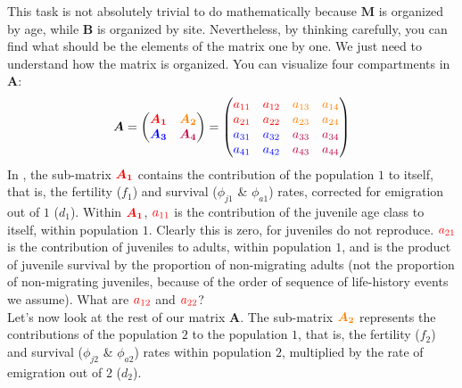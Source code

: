 \documentclass{article}\usepackage[]{graphicx}\usepackage[]{color}
\begin{document}
This task is not absolutely trivial to do mathematically because $\boldsymbol{M}$ is organized by age, while $\boldsymbol{B}$ is organized by site. 
Nevertheless, by thinking carefully, you can find what should be the elements of the matrix one by one. We just need to understand how the matrix is organized.
You can visualize four compartments in $\boldsymbol{A}$:
\begin{align*}
\boldsymbol{A}=
\begin{pmatrix}
\boldsymbol{\color{red}{A_1}} & \boldsymbol{\color{orange}{A_2}} \\
\boldsymbol{\color{blue}{A_3}} & \boldsymbol{\color{purple}{A_4}}
\end{pmatrix}
=\begin{pmatrix}
  \color{red}{a_{11}} & \color{red}{a_{12}} & \color{orange}{a_{13}} & \color{orange}{a_{14}}\\
  \color{red}{a_{21}} & \color{red}{a_{22}} & \color{orange}{a_{23}} & \color{orange}{a_{24}}\\
  \color{blue}{a_{31}} & \color{blue}{a_{32}} & \color{purple}{a_{33}} & \color{purple}{a_{34}}\\
  \color{blue}{a_{41}} & \color{blue}{a_{42}} & \color{purple}{a_{43}} & \color{purple}{a_{44}}\\
\end{pmatrix}
\end{align*}
In {\color{red}{red}}, the sub-matrix $\boldsymbol{\color{red}{A_1}}$ contains the contribution of the population $1$ to itself, that is, the fertility ($f_1$) and survival ($\phi_{j1}$ \& $\phi_{a1}$) rates, corrected for emigration out of $1$ ($d_1$). Within $\boldsymbol{\color{red}{A_1}}$, $\color{red}{a_{11}}$ is the contribution of the juvenile age class to itself, within population $1$. Clearly this is zero, for juveniles do not reproduce. $\color{red}{a_{21}}$ is the contribution of juveniles to adults, within population $1$, and is the product of juvenile survival by the proportion of non-migrating adults (not the proportion of non-migrating juveniles, because of the order of sequence of life-history events we assume). 
What are $\color{red}{a_{12}}$ and $\color{red}{a_{22}}$?\\

Let's now look at the rest of our matrix $\boldsymbol{A}$. The sub-matrix $\boldsymbol{\color{orange}{A_2}}$ represents the contributions of the population $2$ to the population $1$, that is, the fertility ($f_2$) and survival ($\phi_{j2}$ \& $\phi_{a2}$) rates within population $2$, multiplied by the rate of emigration out of $2$ ($d_2$).
\end{document}
